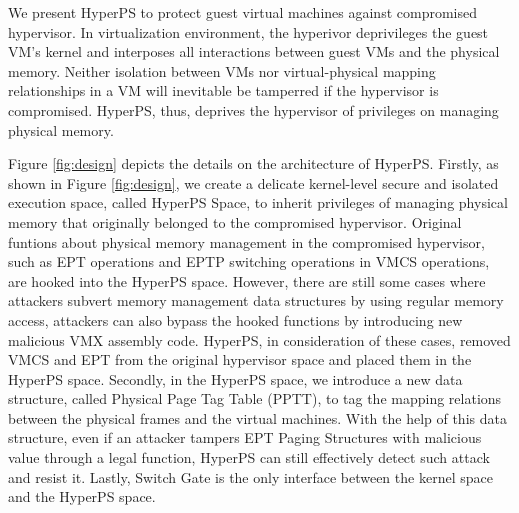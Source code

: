 We present HyperPS to protect guest virtual machines against compromised hypervisor. In virtualization environment, the hyperivor deprivileges the guest VM’s kernel and interposes all interactions between guest VMs and the physical memory. Neither isolation between VMs nor virtual-physical mapping relationships in a VM will inevitable be tamperred if the hypervisor is compromised. HyperPS, thus, deprives the hypervisor of privileges on managing physical memory.


Figure \ref{fig:design} depicts the details on the architecture of HyperPS. 
Firstly, as shown in Figure \ref{fig:design}, we create a delicate kernel-level secure and isolated execution space, called HyperPS Space, to inherit privileges of managing physical memory that originally belonged to the compromised hypervisor. 
Original funtions about physical memory management in the compromised hypervisor, such as EPT operations and EPTP switching operations in VMCS operations, are hooked into the HyperPS space. 
However, there are still some cases where attackers subvert memory management data structures by using regular memory access, attackers can also bypass the hooked functions by introducing new malicious VMX assembly code. HyperPS, in consideration of these cases, removed VMCS and EPT from the original hypervisor space and placed them in the HyperPS space. 
Secondly, in the HyperPS space, we introduce a new data structure, called Physical Page Tag Table (PPTT), to tag the mapping relations between the physical frames and the virtual machines. With the help of this data structure, even if an attacker tampers EPT Paging Structures with malicious value through a legal function, HyperPS can still effectively detect such attack and resist it.
Lastly, Switch Gate is the only interface between the kernel space and the HyperPS space.


